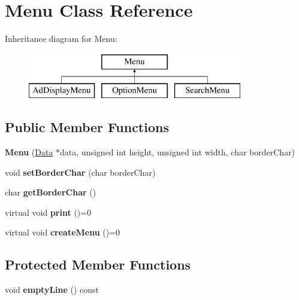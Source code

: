 \hypertarget{class_menu}{}\section{Menu Class Reference}
\label{class_menu}
Inheritance diagram for Menu\+:\begin{figure}[H]
\begin{center}
\leavevmode
\includegraphics[height=2.000000cm]{class_menu}
\end{center}
\end{figure}
\subsection*{Public Member Functions}
\begin{DoxyCompactItemize}
\item 
\hypertarget{class_menu_aaadfa629cab782a6087766f4fc7b19a6}{}{\bfseries Menu} (\hyperlink{class_data}{Data} $\ast$data, unsigned int height, unsigned int width, char border\+Char)\label{class_menu_aaadfa629cab782a6087766f4fc7b19a6}

\item 
\hypertarget{class_menu_aa0503578e77400a5609f039ed62d44e7}{}void {\bfseries set\+Border\+Char} (char border\+Char)\label{class_menu_aa0503578e77400a5609f039ed62d44e7}

\item 
\hypertarget{class_menu_afdd6e6b09535ca48838c22d5a753dcfc}{}char {\bfseries get\+Border\+Char} ()\label{class_menu_afdd6e6b09535ca48838c22d5a753dcfc}

\item 
\hypertarget{class_menu_ae1857de4af042320041da50debf81709}{}virtual void {\bfseries print} ()=0\label{class_menu_ae1857de4af042320041da50debf81709}

\item 
\hypertarget{class_menu_af71cfef966c0dfd5ecf5d585ddb16514}{}virtual void {\bfseries create\+Menu} ()=0\label{class_menu_af71cfef966c0dfd5ecf5d585ddb16514}

\end{DoxyCompactItemize}
\subsection*{Protected Member Functions}
\begin{DoxyCompactItemize}
\item 
\hypertarget{class_menu_a58897c5c59d341626fa536ea91960fd5}{}void {\bfseries empty\+Line} () const \label{class_menu_a58897c5c59d341626fa536ea91960fd5}

\end{DoxyCompactItemize}

